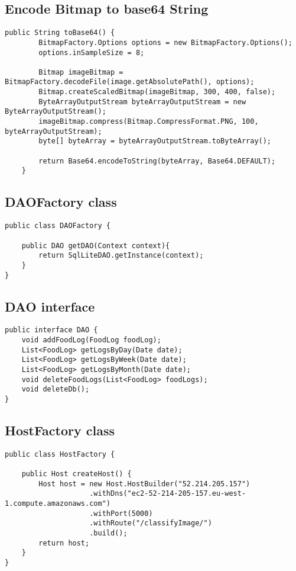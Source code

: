 \subsection*{Encode Bitmap to base64 String}
\begin{lstlisting}[style=Java]
	public String toBase64() {
        BitmapFactory.Options options = new BitmapFactory.Options();
        options.inSampleSize = 8;

        Bitmap imageBitmap = BitmapFactory.decodeFile(image.getAbsolutePath(), options);
        Bitmap.createScaledBitmap(imageBitmap, 300, 400, false);
        ByteArrayOutputStream byteArrayOutputStream = new ByteArrayOutputStream();
        imageBitmap.compress(Bitmap.CompressFormat.PNG, 100, byteArrayOutputStream);
        byte[] byteArray = byteArrayOutputStream.toByteArray();

        return Base64.encodeToString(byteArray, Base64.DEFAULT);
    }
\end{lstlisting}



\subsection*{DAOFactory class}
\begin{lstlisting}[style=Java]
public class DAOFactory {

    public DAO getDAO(Context context){
        return SqlLiteDAO.getInstance(context);
    }
}
\end{lstlisting}



\subsection*{DAO interface}
\begin{lstlisting}[style=Java]
public interface DAO {
    void addFoodLog(FoodLog foodLog);
    List<FoodLog> getLogsByDay(Date date);
    List<FoodLog> getLogsByWeek(Date date);
    List<FoodLog> getLogsByMonth(Date date);
    void deleteFoodLogs(List<FoodLog> foodLogs);
    void deleteDb();
}
\end{lstlisting}


\subsection*{HostFactory class}
\begin{lstlisting}[style=Java]
public class HostFactory {

    public Host createHost() {
        Host host = new Host.HostBuilder("52.214.205.157")
                    .withDns("ec2-52-214-205-157.eu-west-1.compute.amazonaws.com")
                    .withPort(5000)
                    .withRoute("/classifyImage/")
                    .build();
        return host;
    }
}
\end{lstlisting}


